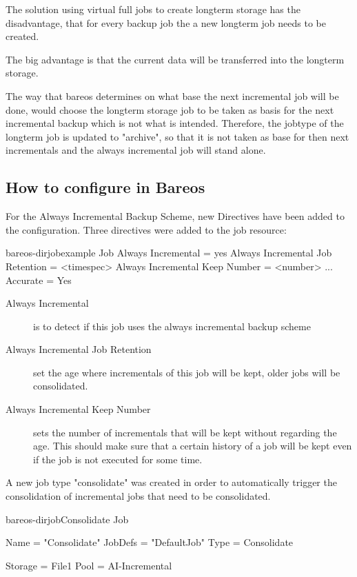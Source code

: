 The solution using virtual full jobs to create longterm storage has the disadvantage, that for every backup job the a new longterm job needs to be created.

The big advantage is that the current data will be transferred into the longterm storage.

The way that bareos determines on what base the next incremental job will be done, would choose the longterm storage job to be taken as basis for the next incremental backup which is not what is intended. Therefore, the jobtype of the 
longterm job is updated to "archive", so that it is not taken as base for then next incrementals and the always incremental job will stand alone.

\subsection{How to configure in Bareos}

For the Always Incremental Backup Scheme, new Directives have been added to the configuration.
Three directives were added to the job resource:

\begin{bareosConfigResource}{bareos-dir}{job}{example}
Job {
    Always Incremental = yes
    Always Incremental Job Retention = <timespec>
    Always Incremental Keep Number = <number>
    ...
    Accurate = Yes
}
\end{bareosConfigResource}

\begin{description}
    \item[Always Incremental] is to detect if this job uses the always incremental backup scheme
    \item[Always Incremental Job Retention] set the age where incrementals of this job will be kept, older jobs will be consolidated.
    \item[Always Incremental Keep Number] sets the number of incrementals that will be kept without regarding the age. This should make sure that a certain history of a  job will be kept even if the job is not executed for some time.
\end{description}



A new job type "consolidate" was created in order to automatically trigger the consolidation of incremental jobs that need to be consolidated.


\begin{bareosConfigResource}{bareos-dir}{job}{Consolidate}
Job {
  Name = "Consolidate"
  JobDefs = "DefaultJob"
  Type = Consolidate

  Storage = File1
  Pool = AI-Incremental
}
\end{bareosConfigResource}



